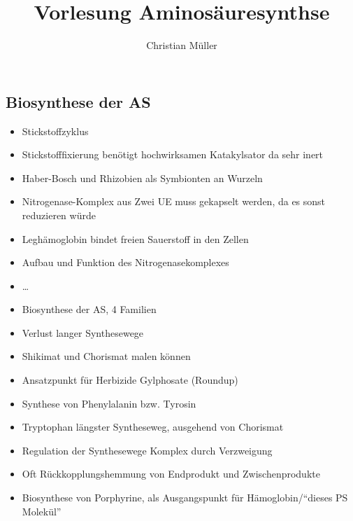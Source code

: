 \documentclass{article}
\begin{document}
\title{Vorlesung Aminosäuresynthse}
\author{Christian Müller}

\subsection{Biosynthese der AS}

\begin{itemize}
	\item Stickstoffzyklus
	\item Stickstofffixierung benötigt hochwirksamen Katakylsator da sehr inert
	\item Haber-Bosch und Rhizobien als Symbionten an Wurzeln
	\item \texrightarrow Nitrogenase-Komplex aus Zwei UE muss gekapselt werden,
		da es sonst  reduzieren würde
	\item Leghämoglobin bindet freien Sauerstoff in den Zellen
	\item Aufbau und Funktion des Nitrogenasekomplexes
	\item \dots
	\item Biosynthese der AS, 4 Familien
	\item Verlust langer Synthesewege
	\item Shikimat und Chorismat malen können
	\item Ansatzpunkt für Herbizide \textrightarrow Gylphosate (Roundup)
	\item Synthese von Phenylalanin bzw. Tyrosin
	\item Tryptophan längster Syntheseweg, ausgehend von Chorismat
	\item Regulation der Synthesewege Komplex durch Verzweigung
	\item Oft Rückkopplungshemmung von Endprodukt und Zwischenprodukte
	\item Biosynthese von Porphyrine, als Ausgangspunkt für Hämoglobin/``dieses PS Molekül''
\end{itemize}
\end{document}
